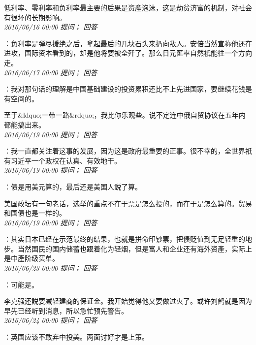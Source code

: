 \documentclass[twocolumn]{ctexart}
\begin{document}
低利率、零利率和负利率最主要的后果是资產泡沫，这是劫贫济富的机制，对社会有很坏的长期影响。\\

\textit{\hfill\noindent\small 2016/06/16 00:00 提问； 回答}

：负利率是弹尽援绝之后，拿起最后的几块石头来扔向敌人。安倍当然宣称他还在进攻，国际资本看到的，却是他将要被全歼了。那么日元匯率自然衹能往一个方向走。\\

\textit{\hfill\noindent\small 2016/06/17 00:00 提问； 回答}

：我对那句话的理解是中国基础建设的投资累积还比不上先进国家，要继续花钱是有空间的。

至于\&ldquo;一带一路\&rdquo;，我比你乐观些。说不定连中俄自贸协议在五年内都能搞出来。\\

\textit{\hfill\noindent\small 2016/06/19 00:00 提问； 回答}

：我一直都关注着这事的发展，因为这是政府最重要的正事。很不幸的，全世界衹有习近平一个政权在认真、有效地干。\\

\textit{\hfill\noindent\small 2016/06/19 00:00 提问； 回答}

：债是用美元算的，最后还是美国人説了算。

美国政坛有一句老话，选举的重点不在于票是怎么投的，而在于是怎么算的。贸易和国债也是一样的。\\

\textit{\hfill\noindent\small 2016/06/19 00:00 提问； 回答}

：其实日本已经在示范最终的结果，也就是拼命印钞票，把债贬值到无足轻重的地步。当然国民的国内储蓄也跟着化为轻烟，但是富人和企业还有海外资產，实际上是中產阶级买单。\\

\textit{\hfill\noindent\small 2016/06/23 00:00 提问； 回答}

：可能是。

李克强还説要减轻建商的保证金。我开始觉得他又要做过火了。或许刘鹤就是因为早先已经听到消息，所以急忙预先警告。\\

\textit{\hfill\noindent\small 2016/06/24 00:00 提问； 回答}

：英国应该不敢弃中投美。两面讨好才是上策。\\
\end{document}
